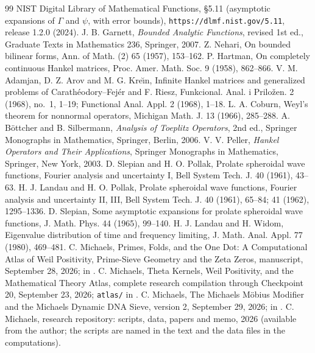 \documentclass[11pt]{article}
\theoremstyle{definition}
\theoremstyle{remark}
\begin{document}
\begin{thebibliography}{99}
 NIST Digital Library of Mathematical Functions, \S5.11 (asymptotic expansions of $\Gamma$ and $\psi$, with error bounds), \texttt{https://dlmf.nist.gov/5.11}, release 1.2.0 (2024).
 J. B. Garnett, \emph{Bounded Analytic Functions}, revised 1st ed., Graduate Texts in Mathematics 236, Springer, 2007.
 Z. Nehari, On bounded bilinear forms, Ann. of Math. (2) 65 (1957), 153--162.
 P. Hartman, On completely continuous Hankel matrices, Proc. Amer. Math. Soc. 9 (1958), 862--866.
 V. M. Adamjan, D. Z. Arov and M. G. Kre\u{\i}n, Infinite Hankel matrices and generalized problems of Carath\'eodory--Fej\'er and F. Riesz, Funkcional. Anal. i Prilo\v{z}en. 2 (1968), no.~1, 1--19; Functional Anal. Appl. 2 (1968), 1--18.
 L. A. Coburn, Weyl's theorem for nonnormal operators, Michigan Math. J. 13 (1966), 285--288.
 A. B\"ottcher and B. Silbermann, \emph{Analysis of Toeplitz Operators}, 2nd ed., Springer Monographs in Mathematics, Springer, Berlin, 2006.
 V. V. Peller, \emph{Hankel Operators and Their Applications}, Springer Monographs in Mathematics, Springer, New York, 2003.
 D. Slepian and H. O. Pollak, Prolate spheroidal wave functions, Fourier analysis and uncertainty I, Bell System Tech. J. 40 (1961), 43--63.
 H. J. Landau and H. O. Pollak, Prolate spheroidal wave functions, Fourier analysis and uncertainty II, III, Bell System Tech. J. 40 (1961), 65--84; 41 (1962), 1295--1336.
 D. Slepian, Some asymptotic expansions for prolate spheroidal wave functions, J. Math. Phys. 44 (1965), 99--140.
 H. J. Landau and H. Widom, Eigenvalue distribution of time and frequency limiting, J. Math. Anal. Appl. 77 (1980), 469--481.
 C. Michaels, Primes, Folds, and the One Dot: A Computational Atlas of Weil Positivity, Prime-Sieve Geometry and the Zeta Zeros, manuscript, September 28, 2026; in \cite{michaels-repo}.
 C. Michaels, Theta Kernels, Weil Positivity, and the Mathematical Theory Atlas, complete research compilation through Checkpoint 20, September 23, 2026; \texttt{atlas/} in \cite{michaels-repo}.
 C. Michaels, The Michaels M\"obius Modifier and the Michaels Dynamic DNA Sieve, version 2, September 29, 2026; in \cite{michaels-repo}.
 C. Michaels, research repository: scripts, data, papers and memo, 2026 (available from the author; the scripts are named in the text and the data files in the computations).
\end{thebibliography}
\end{document}
